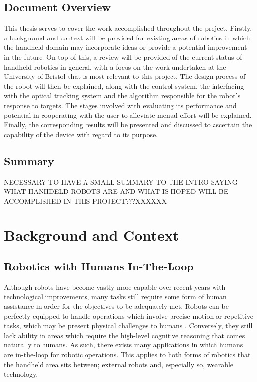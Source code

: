 \documentclass[11pt]{article}
\begin{document}
\subsection{Document Overview}
This thesis serves to cover the work accomplished throughout the project. Firstly, a background and context will be provided for existing areas of robotics in which the handheld domain may incorporate ideas or provide a potential improvement in the future. On top of this, a review will be provided of the current status of handheld robotics in general, with a focus on the work undertaken at the University of Bristol that is most relevant to this project. The design process of the robot will then be explained, along with the control system, the interfacing with the optical tracking system and the algorithm responsible for the robot's response to targets. The stages involved with evaluating its performance and potential in cooperating with the user to alleviate mental effort will be explained. Finally, the corresponding results will be presented and discussed to ascertain the capability of the device with regard to its purpose.

\subsection{Summary}
NECESSARY TO HAVE A SMALL SUMMARY TO THE INTRO SAYING WHAT HANHDELD ROBOTS ARE AND WHAT IS HOPED WILL BE ACCOMPLISHED IN THIS PROJECT???XXXXXX
\pagebreak

\section{Background and Context}
\subsection{Robotics with Humans In-The-Loop} \label{intheloop}

Although robots have become vastly more capable over recent years with technological improvements, many tasks still require some form of human assistance in order for the objectives to be adequately met. Robots can be perfectly equipped to handle operations which involve precise motion or repetitive tasks, which may be present physical challenges to humans \cite{Chipalkatty2012}. Conversely, they still lack ability in areas which require the high-level cognitive reasoning that comes naturally to humans. As such, there exists many applications in which humans are in-the-loop for robotic operations. This applies to both forms of robotics that the handheld area sits between; external robots and, especially so, wearable technology.  
\end{document}
